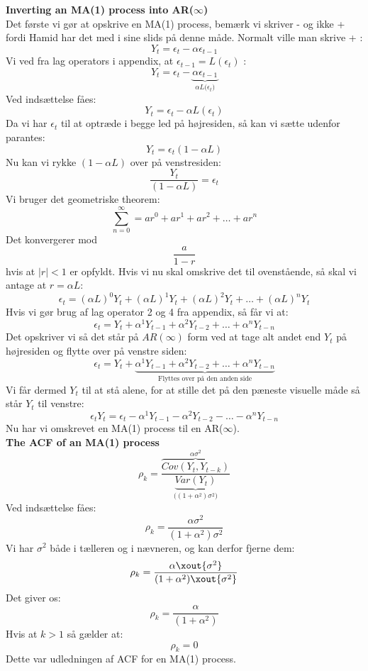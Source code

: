 \documentclass[
  10pt,
]{article}
\begin{document}
\textbf{Inverting an MA(1) process into AR($\infty$)}\\
Det første vi gør at opskrive en MA(1) process, bemærk vi skriver - og
ikke + fordi Hamid har det med i sine slids på denne måde. Normalt ville
man skrive + : \[Y_t = \epsilon_t  - \alpha \epsilon_{t-1} \] Vi ved fra
lag operators i appendix, at \(\epsilon_{t-1} = L(\epsilon_t)\) :
\[Y_t = \epsilon_t  - \underbrace{\alpha \epsilon_{t-1}}_\text{$\alpha L( \epsilon_t$)} \]
Ved indsættelse fåes: \[Y_t = \epsilon_t  - \alpha L(\epsilon_t) \] Da
vi har \(\epsilon_t\) til at optræde i begge led på højresiden, så kan
vi sætte udenfor parantes: \[Y_t = \epsilon_t(1 - \alpha L) \] Nu kan vi
rykke \((1 - \alpha L)\) over på venstresiden:
\[\frac{Y_t}{(1 - \alpha L)} = \epsilon_t \] Vi bruger det geometriske
theorem: \[\sum_{n=0}^\infty = ar^0 + ar^1 + ar^2 + \dots + ar^n \] Det
konvergerer mod \[\frac{a}{1-r} \] hvis at \(|r| < 1\) er opfyldt. Hvis
vi nu skal omskrive det til ovenstående, så skal vi antage at
\(r = \alpha L\):
\[\epsilon_t = (\alpha L)^0Y_t + (\alpha L)^1Y_t + (\alpha L)^2 Y_t + \dots + (\alpha L)^nY_t \]
Hvis vi gør brug af lag operator 2 og 4 fra appendix, så får vi at:
\[\epsilon_t = Y_t + \alpha^1 Y_{t-1} + \alpha^2 Y_{t-2} + \dots + \alpha^n Y_{t-n} \]
Det opskriver vi så det står på \(AR(\infty)\) form ved at tage alt
andet end \(Y_t\) på højresiden og flytte over på venstre siden:
\[\epsilon_t = Y_t + \underbrace{\alpha^1 Y_{t-1} + \alpha^2 Y_{t-2} + \dots + \alpha^n Y_{t-n}}_\text{Flyttes over på den anden side} \]
Vi får dermed \(Y_t\) til at stå alene, for at stille det på den pæneste
visuelle måde så står \(Y_t\) til venstre:
\[\epsilon_t Y_t = \epsilon_t - \alpha^1 Y_{t-1} - \alpha^2 Y_{t-2} - \dots - \alpha^n Y_{t-n} \]
Nu har vi omskrevet en MA(1) process til en AR(\(\infty\)).\\

\textbf{The ACF of an MA(1) process}\\
\[\rho_k = \frac{\overbrace{Cov(Y_t,Y_{t-k})}^{\alpha \sigma^2}}{\underbrace{Var(Y_t)}_\text{($(1+\alpha^2)\sigma^2$)}} \]
Ved indsættelse fåes:\\
\[\rho_k = \frac{\alpha \sigma^2}{(1+\alpha^2)\sigma^2} \] Vi har
\(\sigma^2\) både i tælleren og i nævneren, og kan derfor fjerne dem:\\
\[\rho_k = \frac{\alpha \xout{\sigma^2}}{(1+\alpha^2)\xout{\sigma^2}} \]
Det giver os:\\
\[\rho_k = \frac{\alpha}{(1+\alpha^2)} \] Hvis at \(k>1\) så gælder
at:\\
\[\rho_k = 0 \] Dette var udledningen af ACF for en MA(1) process.\\
\end{document}
